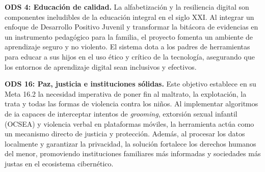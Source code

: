\textbf{ODS 4: Educación de calidad.} La alfabetización y la resiliencia digital son componentes ineludibles de la educación integral en el siglo XXI. Al integrar un enfoque de Desarrollo Positivo Juvenil y transformar la bitácora de evidencias en un instrumento pedagógico para la familia, el proyecto fomenta un ambiente de aprendizaje seguro y no violento. El sistema dota a los padres de herramientas para educar a sus hijos en el uso ético y crítico de la tecnología, asegurando que los entornos de aprendizaje digital sean inclusivos y efectivos.

\textbf{ODS 16: Paz, justicia e instituciones sólidas.} Este objetivo establece en su Meta 16.2 la necesidad imperativa de poner fin al maltrato, la explotación, la trata y todas las formas de violencia contra los niños. Al implementar algoritmos de \gls{ia} capaces de interceptar intentos de \textit{grooming}, extorsión sexual infantil (OCSEA) y violencia verbal en plataformas móviles, la herramienta actúa como un mecanismo directo de justicia y protección. Además, al procesar los datos localmente y garantizar la privacidad, la solución fortalece los derechos humanos del menor, promoviendo instituciones familiares más informadas y sociedades más justas en el ecosistema cibernético.